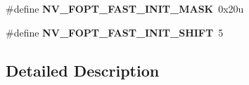 \begin{DoxyCompactItemize}
\item 
\hypertarget{group___n_v___register___masks_ga12400f522457526dbbe9e7e2549adecd}{}\#define {\bfseries N\+V\+\_\+\+F\+O\+P\+T\+\_\+\+F\+A\+S\+T\+\_\+\+I\+N\+I\+T\+\_\+\+M\+A\+S\+K}~0x20u\label{group___n_v___register___masks_ga12400f522457526dbbe9e7e2549adecd}

\item 
\hypertarget{group___n_v___register___masks_gae712cb476b0c59a5ba6ce468e3239a04}{}\#define {\bfseries N\+V\+\_\+\+F\+O\+P\+T\+\_\+\+F\+A\+S\+T\+\_\+\+I\+N\+I\+T\+\_\+\+S\+H\+I\+F\+T}~5\label{group___n_v___register___masks_gae712cb476b0c59a5ba6ce468e3239a04}

\end{DoxyCompactItemize}


\subsection{Detailed Description}
